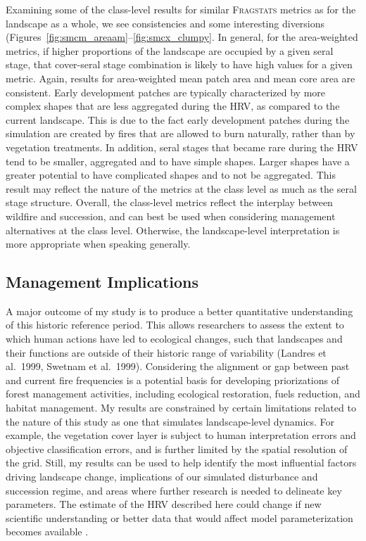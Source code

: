 Examining some of the class-level results for similar \textsc{Fragstats} metrics as for the landscape as a whole, we see consistencies and some interesting diversions (Figures~\ref{fig:smcm_areaam}--\ref{fig:smcx_clumpy}. In general, for the area-weighted metrics, if higher proportions of the landscape are occupied by a given seral stage, that cover-seral stage combination is likely to have high values for a given metric. Again, results for area-weighted mean patch area and mean core area are consistent. Early development patches are typically characterized by more complex shapes that are less aggregated during the HRV, as compared to the current landscape. This is due to the fact early development patches during the simulation are created by fires that are allowed to burn naturally, rather than by vegetation treatments. In addition, seral stages that became rare during the HRV tend to be smaller, aggregated and to have simple shapes. Larger shapes have a greater potential to have complicated shapes and to not be aggregated. This result may reflect the nature of the metrics at the class level as much as the seral stage structure. Overall, the class-level metrics reflect the interplay between wildfire and succession, and can best be used when considering management alternatives at the class level. Otherwise, the landscape-level interpretation is more appropriate when speaking generally. 

\clearpage



\clearpage
\subsection{Management Implications}

A major outcome of my study is to produce a better quantitative understanding of this historic reference period. This allows researchers to assess the extent to which human actions have led to ecological changes, such that landscapes and their functions are outside of their historic range of variability (Landres et al.\ 1999, Swetnam et al.\ 1999). 
%
Considering the alignment or gap between past and current fire frequencies is a potential basis for developing priorizations of forest management activities, including ecological restoration, fuels reduction, and habitat management. 
%
My results are constrained by certain limitations related to the nature of this study as one that simulates landscape-level dynamics. For example, the vegetation cover layer is subject to human interpretation errors and objective classification errors, and is further limited by the spatial resolution of the grid. Still, my results can be used to help identify the most influential factors driving landscape change, implications of our simulated disturbance and succession regime, and areas where further research is needed to delineate key parameters. The estimate of the HRV described here could change if new scientific understanding or better data that would affect model parameterization becomes available .

